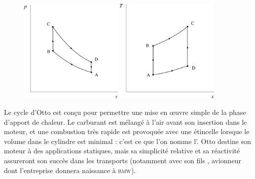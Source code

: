 		\begin{figure}
			\begin{center}
				\includegraphics[width=0.45\textwidth]{images/pv_gp_otto.png}
				\includegraphics[width=0.45\textwidth]{images/ts_gp_otto.png}
			\end{center}
			\label{fig_cycle_otto}
		\end{figure}

		Le cycle d’Otto est conçu pour permettre une mise en œuvre simple de la phase d’apport de chaleur. Le carburant est mélangé à l’air avant son insertion dans le moteur, et une combustion très rapide est provoquée avec une étincelle lorsque le volume dans le cylindre est minimal : c’est ce que l’on nomme l’. Otto destine son moteur à des applications statiques, mais sa simplicité relative et sa réactivité assureront son succès dans les transports (notamment avec son fils , avionneur dont l’entreprise donnera naissance à \textsc{bmw}).

